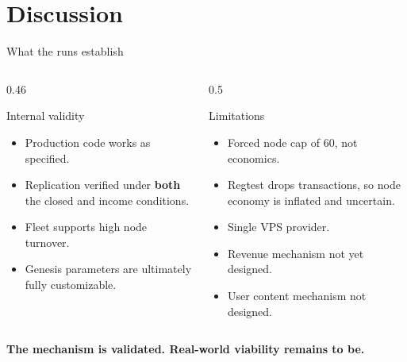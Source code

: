 
{
  \renewcommand{\sectionsubtitle}{Fleet economics, and the limits of the evidence}
  \section{Discussion}
}


{
\begin{frame}{What the runs establish}
  \medskip
  \small
  \begin{columns}[T, onlytextwidth]
    \begin{column}{0.46\textwidth}
      \begin{exampleblock}{Internal validity}
        \begin{itemize}
          \item Production code works as specified.
          \item Replication verified under \textbf{both} the closed and income
            conditions.
          \item Fleet supports high node turnover.
          \item Genesis parameters are ultimately fully customizable.
        \end{itemize}
      \end{exampleblock}
    \end{column}
    \begin{column}{0.5\textwidth}
      \begin{alertblock}{Limitations}
        \begin{itemize}
          \item Forced node cap of 60, not economics.
          \item Regtest drops transactions, so node economy is inflated and uncertain.
          \item Single VPS provider.
          \item Revenue mechanism not yet designed.
          \item User content mechanism not designed.
        \end{itemize}
      \end{alertblock}
    \end{column}
  \end{columns}

  \textcolor{tud Orange}{\textbf{The mechanism is validated. Real-world viability remains to be.}}
\end{frame}
}



